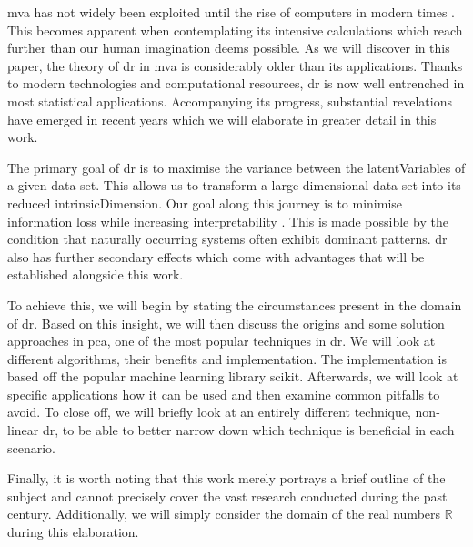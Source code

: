 \Gls{mva} has not widely been exploited until the rise of computers in modern times \cite{Jolliffe2002book}.
This becomes apparent when contemplating its intensive calculations which reach further than our human imagination deems possible.
As we will discover in this paper, the theory of \gls{dr} in \gls{mva} is considerably older than its applications.
Thanks to modern technologies and computational resources, \gls{dr} is now well entrenched in most statistical applications.
Accompanying its progress, substantial revelations have emerged in recent years which we will elaborate in greater detail in this work.
\bigskip


The primary goal of \gls{dr} is to maximise the variance between the \glspl{latentVariable} of a given data set.
This allows us to transform a large dimensional data set into its reduced \gls{intrinsicDimension}.
Our goal along this journey is to minimise information loss while increasing interpretability \cite{jolliffe2016principal}.
This is made possible by the condition that naturally occurring systems often exhibit dominant patterns.
\Gls{dr} also has further secondary effects which come with advantages that will be established alongside this work.
\medskip

To achieve this, we will begin by stating the circumstances present in the domain of \gls{dr}.
Based on this insight, we will then discuss the origins and some solution approaches in \gls{pca}, one of the most popular techniques in \gls{dr}.
We will look at different algorithms, their benefits and implementation.
The implementation is based off the popular machine learning library \gls{scikit}.
Afterwards, we will look at specific applications how it can be used and then examine common pitfalls to avoid.
To close off, we will briefly look at an entirely different technique, non-linear \gls{dr}, to be able to better narrow down which technique is beneficial in each scenario.
\bigskip


Finally, it is worth noting that this work merely portrays a brief outline of the subject and cannot precisely cover the vast research conducted during the past century.
Additionally, we will simply consider the domain of the real numbers $\mathbb{R}$ during this elaboration.


